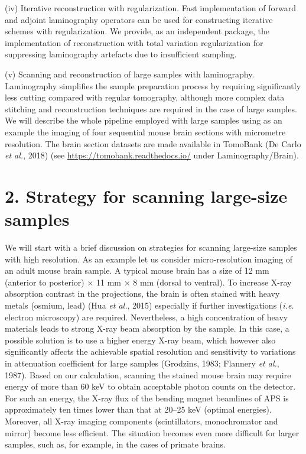 \documentclass{article}
\begin{document}
(iv) Iterative reconstruction with regularization. Fast implementation of forward and adjoint laminography operators can be used for constructing iterative schemes with regularization. We provide, as an independent package, the implementation of reconstruction with total variation regularization for suppressing laminography artefacts due to insufficient sampling.

(v) Scanning and reconstruction of large samples with laminography. Laminography simplifies the sample preparation process by requiring significantly less cutting compared with regular tomography, although more complex data stitching and reconstruction techniques are required in the case of large samples. We will describe the whole pipeline employed with large samples using as an example the imaging of four sequential mouse brain sections with micrometre resolution. The brain section datasets are made available in TomoBank (De Carlo \emph{et al.}, 2018) (see \url{https://tomobank.readthedocs.io/} under Laminography/Brain).

\section*{2. Strategy for scanning large-size samples}

We will start with a brief discussion on strategies for scanning large-size samples with high resolution. As an example let us consider micro-resolution imaging of an adult mouse brain sample. A typical mouse brain has a size of 12 mm (anterior to posterior) × 11 mm × 8 mm (dorsal to ventral). To increase X-ray absorption contrast in the projections, the brain is often stained with heavy metals (osmium, lead) (Hua \emph{et al.}, 2015) especially if further investigations (\emph{i.e.} electron microscopy) are required. Nevertheless, a high concentration of heavy materials leads to strong X-ray beam absorption by the sample. In this case, a possible solution is to use a higher energy X-ray beam, which however also significantly affects the achievable spatial resolution and sensitivity to variations in attenuation coefficient for large samples (Grodzins, 1983; Flannery \emph{et al.}, 1987). Based on our calculation, scanning the stained mouse brain may require energy of more than 60 keV to obtain acceptable photon counts on the detector. For such an energy, the X-ray flux of the bending magnet beamlines of APS is approximately ten times lower than that at 20–25 keV (optimal energies). Moreover, all X-ray imaging components (scintillators, monochromator and mirror) become less efficient. The situation becomes even more difficult for larger samples, such as, for example, in the cases of primate brains.
\end{document}
